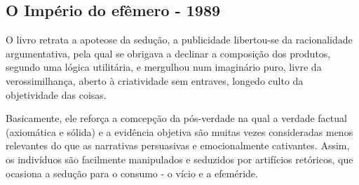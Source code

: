 \documentclass{article}
\begin{document}
\begin{multicols}{2}
\subsection*{O Império do efêmero - 1989}
   O livro retrata a apoteose  da  sedução, a  publicidade libertou-se da racionalidade argumentativa,  pela  qual  se  obrigava  a  declinar  a  composição  dos  produtos,  segundo uma  lógica  utilitária,  e  mergulhou  num imaginário  puro,  livre  da  verossimilhança, aberto  à  criatividade  sem  entraves,  longedo  culto  da  objetividade  das  coisas. 
   
   Basicamente, ele reforça a comcepção da pós-verdade na qual a verdade factual (axiomática e sólida) e a evidência objetiva são muitas vezes consideradas menos relevantes do que as narrativas persuasivas e emocionalmente cativantes. Assim, os indivíduos são facilmente manipulados e seduzidos por artifícios retóricos, que ocasiona a sedução para o consumo - o vício e a efeméride.

\end{multicols}
\end{document}
